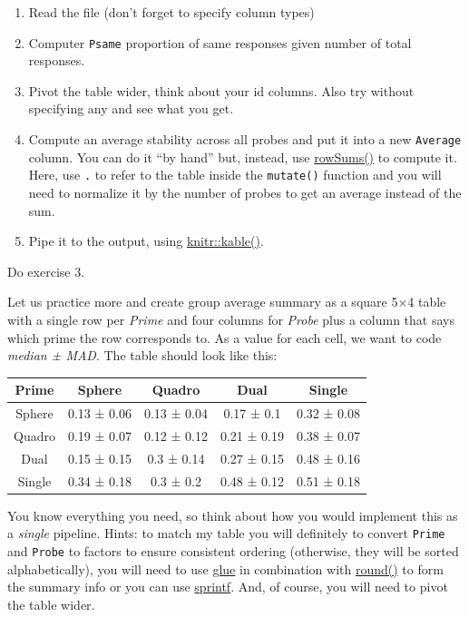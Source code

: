 \documentclass[
]{book}
\providecommand{\tightlist}{%
  \setlength{\itemsep}{0pt}\setlength{\parskip}{0pt}}
\begin{document}
\begin{enumerate}
\def\labelenumi{\arabic{enumi}.}
\tightlist
\item
  Read the file (don't forget to specify column types)
\item
  Computer \texttt{Psame} proportion of same responses given number of total responses.
\item
  Pivot the table wider, think about your id columns. Also try without specifying any and see what you get.
\item
  Compute an average stability across all probes and put it into a new \texttt{Average} column. You can do it ``by hand'' but, instead, use \href{https://stat.ethz.ch/R-manual/R-devel/library/base/html/colSums.html}{rowSums()} to compute it. Here, use \texttt{.} to refer to the table inside the \texttt{mutate()} function and you will need to normalize it by the number of probes to get an average instead of the sum.
\item
  Pipe it to the output, using \href{https://bookdown.org/yihui/rmarkdown-cookbook/kable.html}{knitr::kable()}.
\end{enumerate}

Do exercise 3.

Let us practice more and create group average summary as a square 5×4 table with a single row per \emph{Prime} and four columns for \emph{Probe} plus a column that says which prime the row corresponds to. As a value for each cell, we want to code \emph{median ± MAD}. The table should look like this:

\begin{tabular}{c|c|c|c|c}
\hline
Prime & Sphere & Quadro & Dual & Single\\
\hline
Sphere & 0.13 ± 0.06 & 0.13 ± 0.04 & 0.17 ± 0.1 & 0.32 ± 0.08\\
\hline
Quadro & 0.19 ± 0.07 & 0.12 ± 0.12 & 0.21 ± 0.19 & 0.38 ± 0.07\\
\hline
Dual & 0.15 ± 0.15 & 0.3 ± 0.14 & 0.27 ± 0.15 & 0.48 ± 0.16\\
\hline
Single & 0.34 ± 0.18 & 0.3 ± 0.2 & 0.48 ± 0.12 & 0.51 ± 0.18\\
\hline
\end{tabular}

You know everything you need, so think about how you would implement this as a \emph{single} pipeline. Hints: to match my table you will definitely to convert \texttt{Prime} and \texttt{Probe} to factors to ensure consistent ordering (otherwise, they will be sorted alphabetically), you will need to use \protect\hyperlink{gluing-in-correlation-strength-in}{glue} in combination with \href{https://stat.ethz.ch/R-manual/R-devel/library/base/html/Round.html}{round()} to form the summary info or you can use \protect\hyperlink{sprintf}{sprintf}. And, of course, you will need to pivot the table wider.
\end{document}
